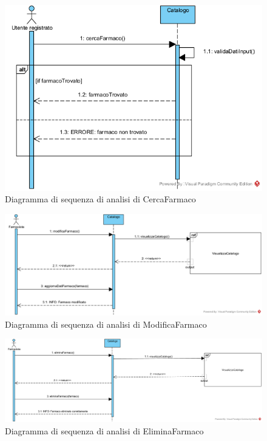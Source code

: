 \begin{figure}[!hbp]
	\centering
	\includegraphics[width=0.7\linewidth]{assets/sequence_analisi/SequenceAnalisiCercaFarmaco.png}
	\caption{Diagramma di sequenza di analisi di CercaFarmaco}
\end{figure}

\begin{figure}[!hbp]
	\centering
	\includegraphics[width=\linewidth]{assets/sequence_analisi/SequenceAnalisiModificaFarmaco.png}
	\caption{Diagramma di sequenza di analisi di ModificaFarmaco}
\end{figure}

\begin{figure}[!hbp]
	\centering
	\includegraphics[width=\linewidth]{assets/sequence_analisi/SequenceAnalisiEliminaFarmaco.png}
	\caption{Diagramma di sequenza di analisi di EliminaFarmaco}
\end{figure}

